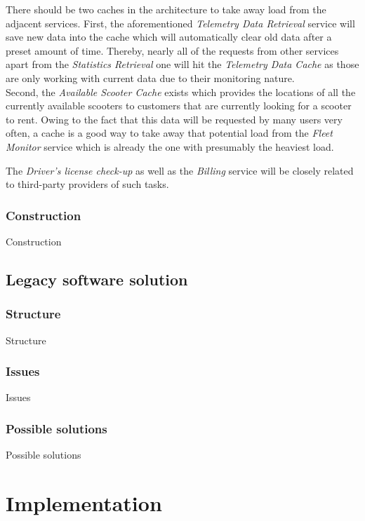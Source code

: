 \documentclass[12pt,a4paper]{report}
\begin{document}
There should be two caches in the architecture to take away load from the
adjacent services. First, the aforementioned \textit{Telemetry Data Retrieval}
service will save new data into the cache which will automatically clear old
data after a preset amount of time. Thereby, nearly all of the requests from
other services apart from the \textit{Statistics Retrieval} one will hit the
\textit{Telemetry Data Cache} as those are only working with current data due
to their monitoring nature.\\
Second, the \textit{Available Scooter Cache} exists which provides the locations
of all the currently available scooters to customers that are currently looking
for a scooter to rent. Owing to the fact that this data will be requested by
many users very often, a cache is a good way to take away that potential load
from the \textit{Fleet Monitor} service which is already the one with
presumably the heaviest load.

The \textit{Driver's license check-up} as well as the \textit{Billing} service
will be closely related to third-party providers of such tasks.


\subsection{Construction}

Construction


\section{Legacy software solution} \label{sect:legacy-solution}

\subsection{Structure}

Structure


\subsection{Issues}

Issues


\subsection{Possible solutions}

Possible solutions


\chapter{Implementation} \label{chap:implementation}
\end{document}

